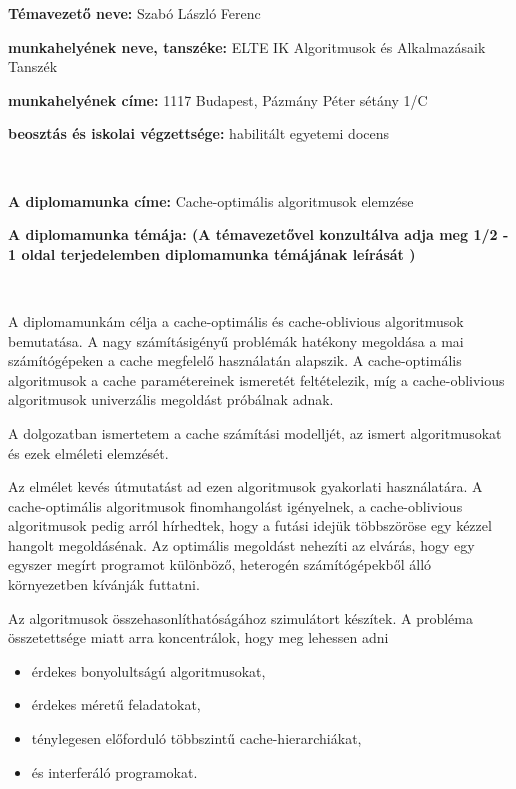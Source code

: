 \documentclass[a4paper]{report}
\begin{document}
\textbf{Témavezető neve:} Szabó László Ferenc

\textbf{munkahelyének neve, tanszéke:} ELTE IK Algoritmusok és Alkalmazásaik Tanszék

\textbf{munkahelyének címe:} 1117 Budapest, Pázmány Péter sétány 1/C

\textbf{beosztás és iskolai végzettsége:} habilitált egyetemi docens

\

\textbf{A diplomamunka címe:} Cache-optimális algoritmusok elemzése

\textbf{A diplomamunka témája: (A témavezetővel konzultálva adja meg 1/2 - 1 oldal terjedelemben diplomamunka témájának  leírását )}

\

A diplomamunkám célja a cache-optimális és cache-oblivious algoritmusok bemutatása.
A nagy számításigényű problémák hatékony megoldása a mai számítógépeken a cache megfelelő használatán alapszik.
A cache-optimális algoritmusok a cache paramétereinek ismeretét feltételezik, míg a cache-oblivious algoritmusok univerzális megoldást próbálnak adnak.

A dolgozatban ismertetem a cache számítási modelljét, az ismert algoritmusokat és ezek elméleti elemzését.

Az elmélet kevés útmutatást ad ezen algoritmusok gyakorlati használatára.
A cache-optimális algoritmusok finomhangolást igényelnek, a cache-oblivious algoritmusok pedig arról hírhedtek, hogy a futási idejük többszöröse egy kézzel hangolt megoldásénak.
Az optimális megoldást nehezíti az elvárás, hogy egy egyszer megírt programot különböző, heterogén számítógépekből álló környezetben kívánják futtatni.

Az algoritmusok összehasonlíthatóságához szimulátort készítek.
A probléma összetettsége miatt arra koncentrálok, hogy meg lehessen adni
\begin{itemize}
\item érdekes bonyolultságú algoritmusokat,
\item érdekes méretű feladatokat,
\item ténylegesen előforduló többszintű cache-hierarchiákat,
\item és interferáló programokat.
\end{itemize}
\end{document}
